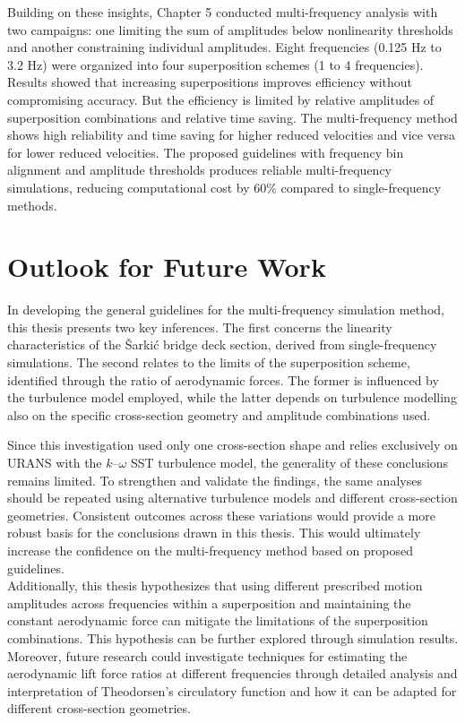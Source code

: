 \documentclass[../main]{subfiles}
\begin{document}
Building on these insights, Chapter 5 conducted multi-frequency analysis with two campaigns: 
one limiting the sum of amplitudes below nonlinearity thresholds and another constraining individual 
amplitudes. Eight frequencies (0.125 Hz to 3.2 Hz) were organized into four superposition schemes (1 to 4 frequencies). 
Results showed that increasing superpositions improves efficiency without compromising accuracy. 
But the efficiency is limited by relative amplitudes of superposition combinations and relative time saving. 
The multi-frequency method shows high reliability and time saving for higher reduced velocities and vice versa 
for lower reduced velocities. The proposed guidelines with frequency bin alignment and amplitude thresholds produces reliable 
multi-frequency simulations, reducing computational cost by 60$\%$ compared to single-frequency methods. \\

\section{Outlook for Future Work}

In developing the general guidelines for the multi-frequency simulation method, this thesis presents two key inferences. 
The first concerns the linearity characteristics of the \v{S}arki\'c bridge deck section, derived from single-frequency simulations. 
The second relates to the limits of the superposition scheme, identified through the ratio of aerodynamic forces. 
The former is influenced by the turbulence model employed, while the latter depends on turbulence modelling also on 
the specific cross-section geometry and amplitude combinations used.

Since this investigation used only one cross-section shape and relies exclusively on URANS with the 
$k$--$\omega$ SST turbulence model, the generality of these conclusions remains limited. To strengthen and validate the 
findings, the same analyses should be repeated using alternative turbulence models and different cross-section 
geometries. Consistent outcomes across these variations would provide a more robust basis for the conclusions drawn 
in this thesis. This would ultimately increase the confidence on the multi-frequency method based on proposed guidelines. \\

Additionally, this thesis hypothesizes that using different prescribed motion amplitudes across frequencies within a 
superposition and maintaining the constant aerodynamic force can mitigate the limitations of the superposition combinations. 
This hypothesis can be further explored through simulation results. Moreover, future research could investigate techniques for 
estimating the aerodynamic lift force ratios at different frequencies through detailed analysis and interpretation of Theodorsen's 
circulatory function and how it can be adapted for different cross-section geometries. 
\end{document}
